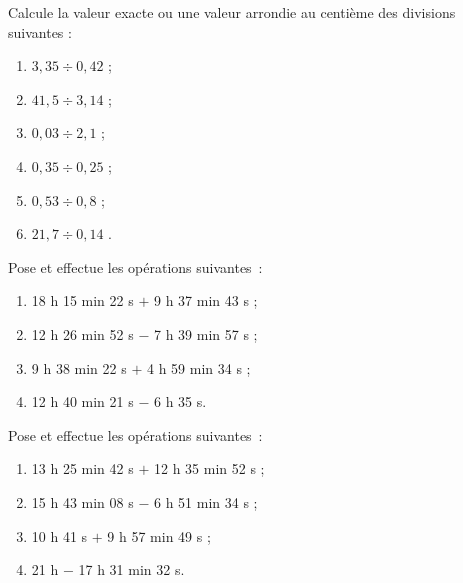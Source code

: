 \begin{exercice} 
Calcule la valeur exacte ou une valeur arrondie au centième des divisions suivantes :
\begin{enumerate} 
 \item $3,35 \div 0,42$ \dotfill ; \hspace*{11em}

 \item $41,5 \div 3,14$ \dotfill ; \hspace*{11em}

 \item $ 0,03 \div 2,1$ \dotfill ; \hspace*{11em}

 \item $0,35 \div 0,25$ \dotfill ; \hspace*{11em}

 \item $0,53 \div 0,8$ \dotfill ; \hspace*{11em}

 \item $21,7 \div 0,14$ \dotfill. \hspace*{11em}
 \end{enumerate}
\end{exercice}




\begin{exercice}
Pose et effectue les opérations suivantes :
\begin{enumerate} 
 \item 18 h 15 min 22 s $+$ 9 h 37 min 43 s ;
 \item 12 h 26 min 52 s $-$ 7 h 39 min 57 s ;
 \item 9 h 38 min 22 s $+$ 4 h 59 min 34 s ;
 \item 12 h 40 min 21 s $-$ 6 h 35 s.
 \end{enumerate}
\end{exercice}


\begin{exercice}
Pose et effectue les opérations suivantes :
\begin{enumerate} 
 \item 13 h 25 min 42 s $+$ 12 h 35 min 52 s ;
 \item 15 h 43 min 08 s $-$ 6 h 51 min 34 s ;
 \item 10 h 41 s $+$ 9 h 57 min 49 s ;
 \item 21 h $-$ 17 h 31 min 32 s.
 \end{enumerate}
\end{exercice}


